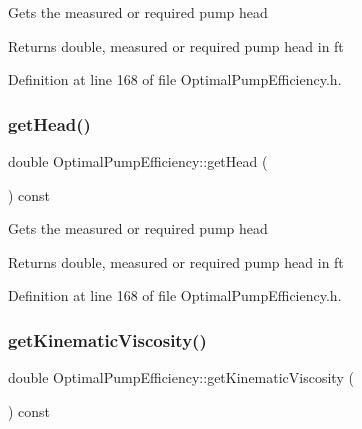 Gets the measured or required pump head

\begin{DoxyReturn}{Returns}
double, measured or required pump head in ft 
\end{DoxyReturn}


Definition at line 168 of file Optimal\+Pump\+Efficiency.\+h.

\mbox{\label{class_optimal_pump_efficiency_af31fdb10aabc197ff7536c9bbe006573}} 
\subsubsection{\texorpdfstring{get\+Head()}{getHead()}\hspace{0.1cm}{\footnotesize\ttfamily [3/3]}}
{\footnotesize\ttfamily double Optimal\+Pump\+Efficiency\+::get\+Head (\begin{DoxyParamCaption}{ }\end{DoxyParamCaption}) const\hspace{0.3cm}{\ttfamily [inline]}}

Gets the measured or required pump head

\begin{DoxyReturn}{Returns}
double, measured or required pump head in ft 
\end{DoxyReturn}


Definition at line 168 of file Optimal\+Pump\+Efficiency.\+h.

\mbox{\label{class_optimal_pump_efficiency_a8c2f7fcacce2b42ed83f29aec2d4671e}} 
\subsubsection{\texorpdfstring{get\+Kinematic\+Viscosity()}{getKinematicViscosity()}\hspace{0.1cm}{\footnotesize\ttfamily [1/3]}}
{\footnotesize\ttfamily double Optimal\+Pump\+Efficiency\+::get\+Kinematic\+Viscosity (\begin{DoxyParamCaption}{ }\end{DoxyParamCaption}) const\hspace{0.3cm}{\ttfamily [inline]}}

